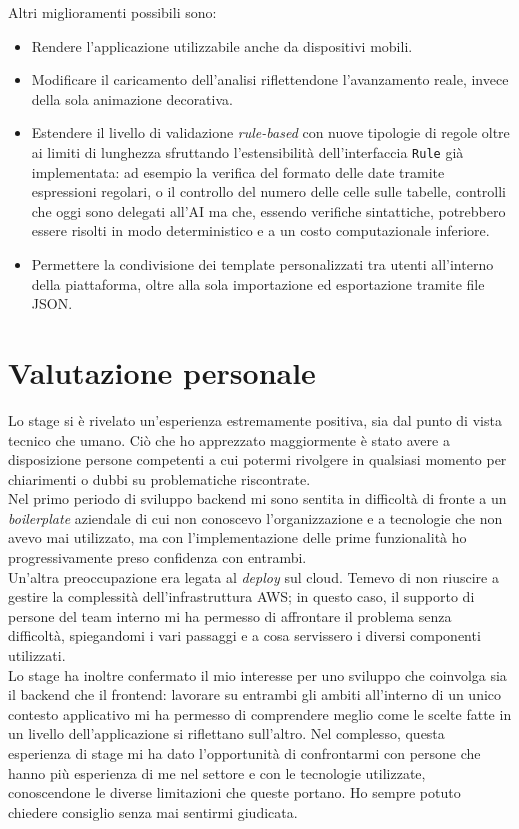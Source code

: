 Altri miglioramenti possibili sono: 
\begin{itemize} 
    \item Rendere l'applicazione utilizzabile anche da dispositivi mobili.
    \item Modificare il caricamento dell'analisi riflettendone l'avanzamento reale, invece della sola animazione decorativa.
    \item Estendere il livello di validazione \emph{rule-based} con nuove tipologie di regole oltre ai limiti di lunghezza sfruttando l'estensibilità dell'interfaccia \texttt{Rule} già implementata: ad esempio la verifica del formato delle date tramite espressioni regolari, o il controllo del numero delle celle sulle tabelle, controlli che oggi sono delegati all'AI ma che, essendo verifiche sintattiche, potrebbero essere risolti in modo deterministico e a un costo computazionale inferiore. 
    \item Permettere la condivisione dei template personalizzati tra utenti all'interno della piattaforma, oltre alla sola importazione ed esportazione tramite file JSON. 
\end{itemize}

\section{Valutazione personale}
Lo stage si è rivelato un'esperienza estremamente positiva, sia dal punto di vista tecnico che umano. Ciò che ho apprezzato maggiormente è stato avere a disposizione persone competenti a cui potermi rivolgere in qualsiasi momento per chiarimenti o dubbi su problematiche riscontrate. \\

Nel primo periodo di sviluppo backend mi sono sentita in difficoltà di fronte a un \emph{boilerplate} aziendale di cui non conoscevo l'organizzazione e a tecnologie che non avevo mai utilizzato, ma con l'implementazione delle prime funzionalità ho progressivamente preso confidenza con entrambi. \\

Un'altra preoccupazione era legata al \emph{deploy} sul cloud. Temevo di non riuscire a gestire la complessità dell'infrastruttura AWS; in questo caso, il supporto di persone del team interno mi ha permesso di affrontare il problema senza difficoltà, spiegandomi i vari passaggi e a cosa servissero i diversi componenti utilizzati. \\

Lo stage ha inoltre confermato il mio interesse per uno sviluppo che coinvolga sia il backend che il frontend: lavorare su entrambi gli ambiti all'interno di un unico contesto applicativo mi ha permesso di comprendere meglio come le scelte fatte in un livello dell'applicazione si riflettano sull'altro. Nel complesso, questa esperienza di stage mi ha dato l'opportunità di confrontarmi con persone che hanno più esperienza di me nel settore e con le tecnologie utilizzate, conoscendone le diverse limitazioni che queste portano. Ho sempre potuto chiedere consiglio senza mai sentirmi giudicata.